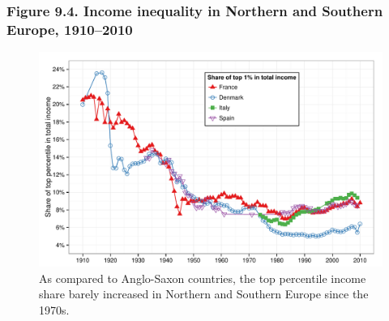 \documentclass[t]{beamer}\usepackage[]{graphicx}\usepackage[]{color}
\newenvironment{knitrout}{}{} %
\begin{document}
\begin{frame}[label=Figure_9_4]
\frametitle{Figure 9.4. Income inequality in Northern and Southern Europe, 1910--2010}
\begin{figure}[t]
\begin{minipage}[b]{\textwidth}
\centering
\begin{knitrout}\footnotesize
{}\color{fgcolor}

{\centering \includegraphics[width=1\linewidth]{figures/color/Figure_9_4} 

}



\end{knitrout}
\caption{As compared to Anglo-Saxon countries, the top percentile income share barely increased in Northern and Southern Europe since the 1970s.}
\end{minipage}
\end{figure}
\end{frame}
\end{document}
